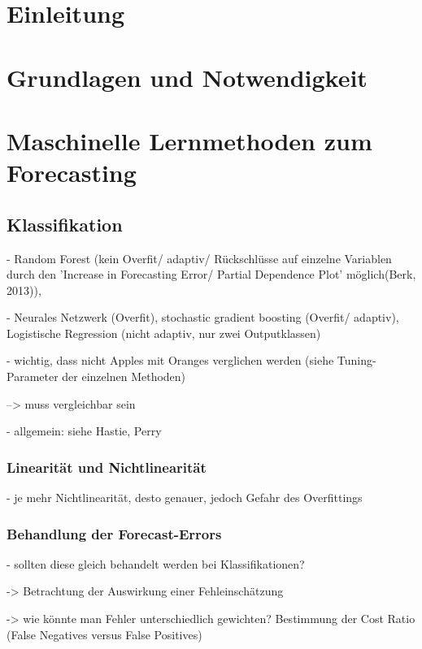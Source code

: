 \documentclass[a4paper,12pt,parskip,bibtotoc,liststotoc]{article}
\begin{document}
\newpage
\section{Einleitung}




\newpage
\section{Grundlagen und Notwendigkeit}



\newpage
\section{Maschinelle Lernmethoden zum Forecasting}

\subsection{Klassifikation}

- Random Forest (kein Overfit/ adaptiv/ Rückschlüsse auf einzelne Variablen durch den 'Increase in Forecasting Error/ Partial Dependence Plot' möglich(Berk, 2013)), 

- Neurales Netzwerk (Overfit), stochastic gradient boosting (Overfit/ adaptiv), Logistische Regression (nicht adaptiv, nur zwei Outputklassen) 

- wichtig, dass nicht Apples mit Oranges verglichen werden (siehe Tuning-Parameter der einzelnen Methoden)

--> muss vergleichbar sein

- allgemein: siehe Hastie, Perry


\subsubsection{Linearität und Nichtlinearität}

- je mehr Nichtlinearität, desto genauer, jedoch Gefahr des Overfittings

\subsubsection{Behandlung der Forecast-Errors}

- sollten diese gleich behandelt werden bei Klassifikationen?

-> Betrachtung der Auswirkung einer Fehleinschätzung

-> wie könnte man Fehler unterschiedlich gewichten? Bestimmung der Cost Ratio (False Negatives versus False Positives)
\end{document}
